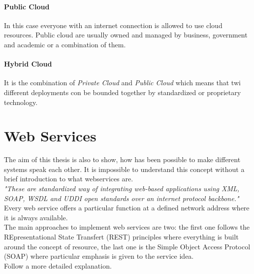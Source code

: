 \paragraph{Public Cloud}
\label{paragraph:Public Cloud}
In this case everyone with an internet connection is allowed to use cloud resources. Public cloud are usually owned and managed by business, government and academic or a combination of them.
\paragraph{Hybrid Cloud}
\label{paragraph:Hybrid Cloud}
It is the combination of \textit{Private Cloud} and \textit{Public Cloud} which means that twi different deployments con be bounded together by standardized or proprietary technology.


\section{Web Services}
The aim of this thesis is also to show, how has been possible to make different systems speak each other.
It is impossible to understand this concept without a brief introduction to what webservices are.\\
\textit{"These are standardized way of integrating web-based applications using XML, SOAP, WSDL and UDDI open standards over an internet protocol backbone."}\cite{webservice}
Every web service offers a particular function at a defined network address where it is always available.\\
The main approaches to implement web services are two: the first one follows the REpresentational State Transfert (REST) principles where everything is built around the concept of resource, the last one is the Simple Object Access Protocol (SOAP) where particular emphasis is given to the service idea.\\
Follow a more detailed explanation.
